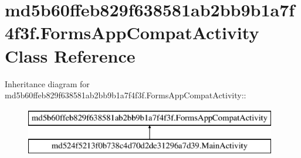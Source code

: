 \hypertarget{classmd5b60ffeb829f638581ab2bb9b1a7f4f3f_1_1_forms_app_compat_activity}{
\section{md5b60ffeb829f638581ab2bb9b1a7f4f3f.FormsAppCompatActivity Class Reference}
\label{classmd5b60ffeb829f638581ab2bb9b1a7f4f3f_1_1_forms_app_compat_activity}
}
Inheritance diagram for md5b60ffeb829f638581ab2bb9b1a7f4f3f.FormsAppCompatActivity::\begin{figure}[H]
\begin{center}
\leavevmode
\includegraphics[height=2cm]{classmd5b60ffeb829f638581ab2bb9b1a7f4f3f_1_1_forms_app_compat_activity}
\end{center}
\end{figure}
